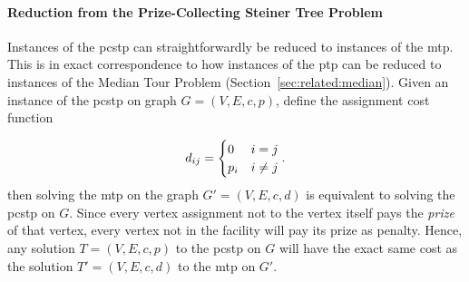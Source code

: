 \paragraph{Reduction from the Prize-Collecting Steiner Tree Problem}
Instances of the \gls{pcstp} can straightforwardly be reduced to instances of the \gls{mtp}. This is in exact correspondence to how instances
of the \gls{ptp} can be reduced to instances of the Median Tour Problem (Section~\ref{sec:related:median}).
Given an instance of the \gls{pcstp} on graph $G = (V, E, c, p)$, define the assignment cost function

$$d_{ij} =
 \begin{cases}
   0 & i = j \\
   p_i & i \neq j
 \end{cases}\mathnormal{.}
 $$
 then solving the \gls{mtp} on the graph $G' = (V, E, c, d)$ is equivalent to solving the \gls{pcstp} on $G$. Since every vertex assignment not
 to the vertex itself pays the \textit{prize} of that vertex, every vertex not in the facility will pay its prize as penalty. Hence,
 any solution $T = (V, E, c, p)$ to the \gls{pcstp} on $G$ will have the exact same cost as the solution $T' = (V, E, c, d)$ to the \gls{mtp} on $G'$.


